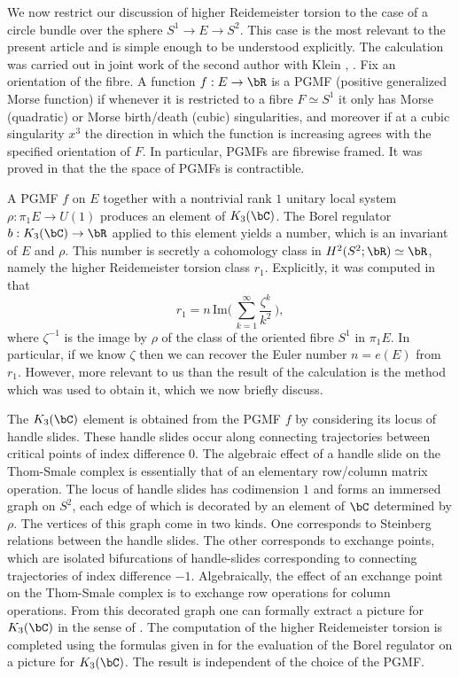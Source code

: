 We now restrict our discussion of higher Reidemeister torsion to the case of a circle bundle over the sphere $S^1 \to E \to S^2$. This case is the most relevant to the present article and is simple enough to be understood explicitly. The calculation was carried out in joint work of the second author with Klein \cite{IK93a}, \cite{IK93}. Fix an orientation of the fibre. A function $f:E \to \bR$ is a PGMF (positive generalized Morse function) if whenever it is restricted to a fibre $F \simeq S^1$ it only has Morse (quadratic) or Morse birth/death (cubic) singularities, and moreover if at a cubic singularity $x^3$ the direction in which the function is increasing agrees with the specified orientation of $F$. In particular, PGMFs are fibrewise framed. It was proved in \cite{IK93} that the the space of PGMFs is contractible.

A PGMF $f$ on $E$ together with a nontrivial rank $1$ unitary local system \hbox{$\rho : \pi_1E \to U(1)$} produces an element of $K_3(\bC)$. The Borel regulator $b:K_3(\bC) \to \bR$ applied to this element yields a number, which is an invariant of $E$ and $\rho$. This number is secretly a cohomology class in $H^2(S^2; \bR) \simeq \bR$, namely the higher Reidemeister torsion class $r_1$. Explicitly, it was computed in \cite{IK93} that\enlargethispage{.5\baselineskip}%
\[ r_1 =n \, \text{Im}\Big( \, \sum_{k=1}^\infty \frac{\zeta^k}{k^2} \, \Big), \]
where $\zeta^{-1}$ is the image by $\rho$ of the class of the oriented fibre $S^1$ in $\pi_1E$. In particular, if we know $\zeta$ then we can recover the Euler number $n=e(E)$ from $r_1$. However, more relevant to us than the result of the calculation is the method which was used to obtain it, which we now briefly discuss.

The $K_3(\bC)$ element is obtained from the PGMF $f$ by considering its locus of handle slides. These handle slides occur along connecting trajectories between critical points of index difference $0$. The algebraic effect of a handle slide on the Thom-Smale complex is essentially that of an elementary row/column matrix operation. The locus of handle slides has codimension $1$ and forms an immersed graph on $S^2$, each edge of which is decorated by an element of $\bC$ determined by $\rho$. The vertices of this graph come in two kinds. One corresponds to Steinberg relations between the handle slides. The other corresponds to exchange points, which are isolated bifurcations of handle-slides corresponding to connecting trajectories of index difference $-1.$ Algebraically, the effect of an exchange point on the Thom-Smale complex is to exchange row operations for column operations. From this decorated graph one can formally extract a picture for $K_3(\bC)$ in the sense of \cite{K}. The computation of the higher Reidemeister torsion is completed using the formulas given in \cite{IK93} for the evaluation of the Borel regulator on a picture for $K_3(\bC)$. The result is independent of the choice of the PGMF.

